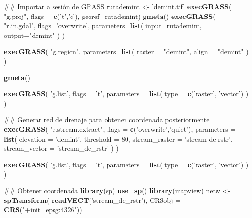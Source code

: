 \documentclass[11pt,]{article}
\newenvironment{Shaded}{\begin{snugshade}}{\end{snugshade}}
\newcommand{\KeywordTok}[1]{\textcolor[rgb]{0.13,0.29,0.53}{\textbf{#1}}}
\newcommand{\DataTypeTok}[1]{\textcolor[rgb]{0.13,0.29,0.53}{#1}}
\newcommand{\DecValTok}[1]{\textcolor[rgb]{0.00,0.00,0.81}{#1}}
\newcommand{\StringTok}[1]{\textcolor[rgb]{0.31,0.60,0.02}{#1}}
\newcommand{\NormalTok}[1]{#1}
\begin{document}
\begin{Shaded}
\begin{Highlighting}[]
{{{{{\NormalTok{## Importar a sesión de GRASS}
\NormalTok{rutademint <-}\StringTok{ 'demint.tif'}
\KeywordTok{execGRASS}\NormalTok{(}
  \StringTok{"g.proj"}\NormalTok{,}
  \DataTypeTok{flags =} \KeywordTok{c}\NormalTok{(}\StringTok{'t'}\NormalTok{,}\StringTok{'c'}\NormalTok{),}
  \DataTypeTok{georef=}\NormalTok{rutademint)}
\KeywordTok{gmeta}\NormalTok{()}
\KeywordTok{execGRASS}\NormalTok{(}
  \StringTok{"r.in.gdal"}\NormalTok{,}
  \DataTypeTok{flags=}\StringTok{'overwrite'}\NormalTok{,}
  \DataTypeTok{parameters=}\KeywordTok{list}\NormalTok{(}
    \DataTypeTok{input=}\NormalTok{rutademint,}
    \DataTypeTok{output=}\StringTok{"demint"}
\NormalTok{  )}
\NormalTok{)}

\KeywordTok{execGRASS}\NormalTok{(}
  \StringTok{"g.region"}\NormalTok{,}
  \DataTypeTok{parameters=}\KeywordTok{list}\NormalTok{(}
    \DataTypeTok{raster =} \StringTok{"demint"}\NormalTok{,}
    \DataTypeTok{align =} \StringTok{"demint"}
\NormalTok{  )}
\NormalTok{)}

\KeywordTok{gmeta}\NormalTok{()}

\KeywordTok{execGRASS}\NormalTok{(}
  \StringTok{'g.list'}\NormalTok{,}
  \DataTypeTok{flags =} \StringTok{'t'}\NormalTok{,}
  \DataTypeTok{parameters =} \KeywordTok{list}\NormalTok{(}
    \DataTypeTok{type =} \KeywordTok{c}\NormalTok{(}\StringTok{'raster'}\NormalTok{, }\StringTok{'vector'}\NormalTok{)}
\NormalTok{  )}
\NormalTok{)}

\NormalTok{## Generar red de drenaje para obtener coordenada posteriormente}
\KeywordTok{execGRASS}\NormalTok{(}
  \StringTok{"r.stream.extract"}\NormalTok{,}
  \DataTypeTok{flags =} \KeywordTok{c}\NormalTok{(}\StringTok{'overwrite'}\NormalTok{,}\StringTok{'quiet'}\NormalTok{),}
  \DataTypeTok{parameters =} \KeywordTok{list}\NormalTok{(}
    \DataTypeTok{elevation =} \StringTok{'demint'}\NormalTok{,}
    \DataTypeTok{threshold =} \DecValTok{80}\NormalTok{,}
    \DataTypeTok{stream_raster =} \StringTok{'stream-de-rstr'}\NormalTok{,}
    \DataTypeTok{stream_vector =} \StringTok{'stream_de_rstr'}
\NormalTok{  )}
\NormalTok{)}

\KeywordTok{execGRASS}\NormalTok{(}
  \StringTok{'g.list'}\NormalTok{,}
  \DataTypeTok{flags =} \StringTok{'t'}\NormalTok{,}
  \DataTypeTok{parameters =} \KeywordTok{list}\NormalTok{(}
    \DataTypeTok{type =} \KeywordTok{c}\NormalTok{(}\StringTok{'raster'}\NormalTok{, }\StringTok{'vector'}\NormalTok{)}
\NormalTok{  )}
\NormalTok{)}

\NormalTok{## Obtener coordenada}
\KeywordTok{library}\NormalTok{(sp)}
\KeywordTok{use_sp}\NormalTok{()}
\KeywordTok{library}\NormalTok{(mapview)}
\NormalTok{netw <-}\StringTok{ }\KeywordTok{spTransform}\NormalTok{(}
  \KeywordTok{readVECT}\NormalTok{(}\StringTok{'stream_de_rstr'}\NormalTok{),}
  \DataTypeTok{CRSobj =} \KeywordTok{CRS}\NormalTok{(}\StringTok{"+init=epsg:4326"}\NormalTok{))}

}}}}}
\end{Highlighting}
\end{Shaded}
\end{document}
